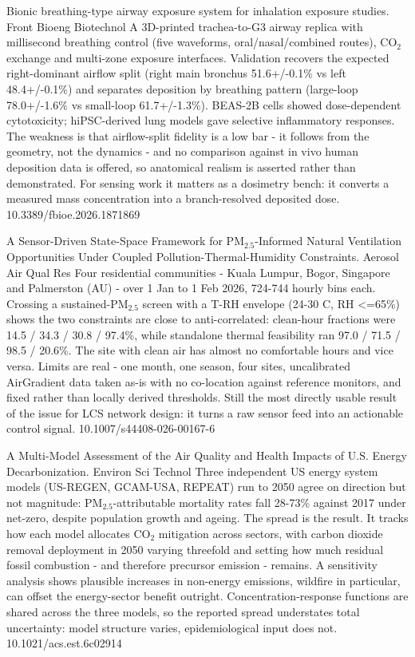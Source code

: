 \documentclass[10pt]{article}
\begin{document}
{Bionic breathing-type airway exposure system for inhalation exposure studies.}
{Front Bioeng Biotechnol}
{A 3D-printed trachea-to-G3 airway replica with millisecond breathing control (five waveforms, oral/nasal/combined routes), CO$_2$ exchange and multi-zone exposure interfaces. Validation recovers the expected right-dominant airflow split (right main bronchus 51.6+/-0.1\% vs left 48.4+/-0.1\%) and separates deposition by breathing pattern (large-loop 78.0+/-1.6\% vs small-loop 61.7+/-1.3\%). BEAS-2B cells showed dose-dependent cytotoxicity; hiPSC-derived lung models gave selective inflammatory responses. The weakness is that airflow-split fidelity is a low bar - it follows from the geometry, not the dynamics - and no comparison against in vivo human deposition data is offered, so anatomical realism is asserted rather than demonstrated. For sensing work it matters as a dosimetry bench: it converts a measured mass concentration into a branch-resolved deposited dose.}
{10.3389/fbioe.2026.1871869}

{A Sensor-Driven State-Space Framework for PM$_{2.5}$-Informed Natural Ventilation Opportunities Under Coupled Pollution-Thermal-Humidity Constraints.}
{Aerosol Air Qual Res}
{Four residential communities - Kuala Lumpur, Bogor, Singapore and Palmerston (AU) - over 1 Jan to 1 Feb 2026, 724-744 hourly bins each. Crossing a sustained-PM$_{2.5}$ screen with a T-RH envelope (24-30 C, RH <=65\%) shows the two constraints are close to anti-correlated: clean-hour fractions were 14.5 / 34.3 / 30.8 / 97.4\%, while standalone thermal feasibility ran 97.0 / 71.5 / 98.5 / 20.6\%. The site with clean air has almost no comfortable hours and vice versa. Limits are real - one month, one season, four sites, uncalibrated AirGradient data taken as-is with no co-location against reference monitors, and fixed rather than locally derived thresholds. Still the most directly usable result of the issue for LCS network design: it turns a raw sensor feed into an actionable control signal.}
{10.1007/s44408-026-00167-6}


{A Multi-Model Assessment of the Air Quality and Health Impacts of U.S. Energy Decarbonization.}
{Environ Sci Technol}
{Three independent US energy system models (US-REGEN, GCAM-USA, REPEAT) run to 2050 agree on direction but not magnitude: PM$_{2.5}$-attributable mortality rates fall 28-73\% against 2017 under net-zero, despite population growth and ageing. The spread is the result. It tracks how each model allocates CO$_2$ mitigation across sectors, with carbon dioxide removal deployment in 2050 varying threefold and setting how much residual fossil combustion - and therefore precursor emission - remains. A sensitivity analysis shows plausible increases in non-energy emissions, wildfire in particular, can offset the energy-sector benefit outright. Concentration-response functions are shared across the three models, so the reported spread understates total uncertainty: model structure varies, epidemiological input does not.}
{10.1021/acs.est.6c02914}
\end{document}
